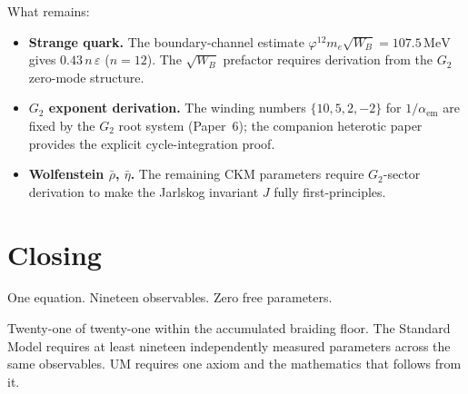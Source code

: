 \documentclass[12pt]{article}
\begin{document}
What remains:
\begin{itemize}
  \item \textbf{Strange quark.} The boundary-channel estimate
        $\varphi^{12}m_e\sqrt{W_B} = 107.5\,\text{MeV}$ gives
        $0.43\,n\,\varepsilon$ ($n = 12$). The $\sqrt{W_B}$ prefactor
        requires derivation from the $G_2$ zero-mode structure.
  \item \textbf{$G_2$ exponent derivation.} The winding numbers
        $\{10, 5, 2, -2\}$ for $1/\alpha_{\text{em}}$ are fixed by the
        $G_2$ root system (Paper~6); the companion heterotic paper
        provides the explicit cycle-integration proof.
  \item \textbf{Wolfenstein $\bar\rho$, $\bar\eta$.} The remaining
        CKM parameters require $G_2$-sector derivation to make the
        Jarlskog invariant $J$ fully first-principles.
\end{itemize}

\section*{Closing}

One equation. Nineteen observables. Zero free parameters.

Twenty-one of twenty-one within the accumulated braiding floor. The Standard
Model requires at least nineteen independently measured parameters across
the same observables. UM requires one axiom and the mathematics that
follows from it.
\end{document}
